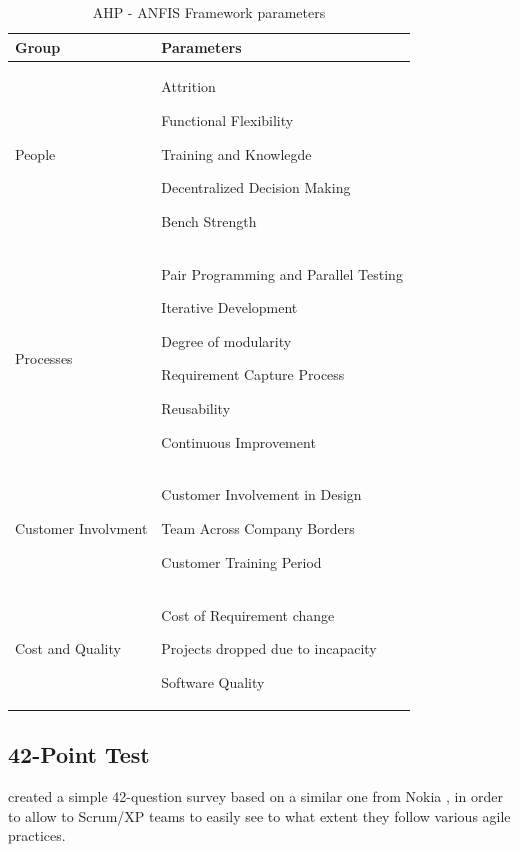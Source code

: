 \begin{table} [H]
\begin{tabular}{| p{3cm} | p{12cm}|}
    \hline
     \textbf{Group} & \textbf{Parameters} \\ \hline
     People  &  \begin{inparaenum} [a\upshape)] \item Attrition \item Functional Flexibility \item Training and Knowlegde \item Decentralized Decision Making \item Bench Strength \end{inparaenum} \\ \hline
     Processes  & \begin{inparaenum} [a\upshape)] \item Pair Programming and Parallel Testing \item Iterative Development \item Degree of modularity \item Requirement Capture Process \item Reusability \item Continuous Improvement
     \end{inparaenum} \\ \hline
    Customer Involvment & \begin{inparaenum} [a\upshape)] \item Customer Involvement in Design \item Team Across Company Borders \item Customer Training Period \end{inparaenum} \\ \hline
     Cost and Quality  & \begin{inparaenum} [a\upshape)] \item Cost of Requirement change \item Projects dropped due to incapacity \item Software Quality \end{inparaenum} \\ \hline
  \end{tabular}
\caption{AHP - ANFIS Framework parameters}
\label{anfis_framework}
\end{table}

\subsection{42-Point Test}
\citet{42points} created a simple 42-question survey based on a similar one from Nokia \cite{nokia}, in order to allow to Scrum/XP teams to easily see to what extent they follow various agile practices.

